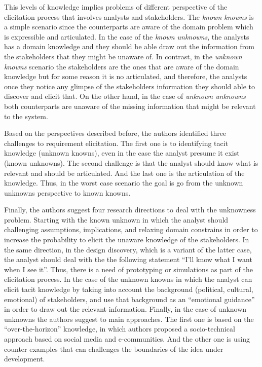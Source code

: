 \documentclass[]{llncs}
\begin{document}
This levels of knowledge implies problems of different perspective of
the elicitation process that involves analysts and stakeholders. The
\emph{known knowns} is a simple scenario since the counterparts are
aware of the domain problem which is expressible and articulated. In the
case of the \emph{known unknowns}, the analysts has a domain knowledge
and they should be able draw out the information from the stakeholders
that they might be unaware of. In contrast, in the \emph{unknown knowns}
scenario the stakeholders are the ones that are aware of the domain
knowledge but for some reason it is no articulated, and therefore, the
analysts once they notice any glimpse of the stakeholders information
they should able to discover and elicit that. On the other hand, in the
case of \emph{unknown unknowns} both counterparts are unaware of the
missing information that might be relevant to the system.

Based on the perspectives described before, the authors identified three
challenges to requirement elicitation. The first one is to identifying
tacit knowledge (unknown knowns), even in the case the analyst presume
it exist (known unknowns). The second challenge is that the analyst
should know what is relevant and should be articulated. And the last one
is the articulation of the knowledge. Thus, in the worst case scenario
the goal is go from the unknown unknowns perspective to known knowns.

Finally, the authors suggest four research directions to deal with the
unknowness problem. Starting with the known unknown in which the analyst
should challenging assumptions, implications, and relaxing domain
constrains in order to increase the probability to elicit the unaware
knowledge of the stakeholders. In the same direction, in the design
discovery, which is a variant of the latter case, the analyst should
deal with the the following statement ``I'll know what I want when I see
it''. Thus, there is a need of prototyping or simulations as part of the
elicitation process. In the case of the unknown knowns in which the
analyst can elicit tacit knowledge by taking into account the background
(political, cultural, emotional) of stakeholders, and use that
background as an ``emotional guidance'' in order to draw out the
relevant information. Finally, in the case of unknown unknowns the
authors suggest to main approaches. The first one is based on the
``over-the-horizon'' knowledge, in which authors proposed a
socio-technical approach based on social media and e-communities. And
the other one is using counter examples that can challenges the
boundaries of the idea under development.
\end{document}
